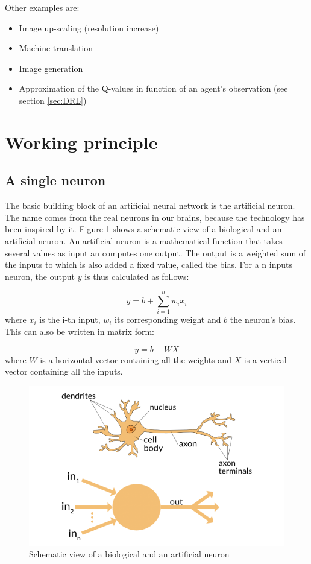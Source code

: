 Other examples are:
\begin{itemize}
    \item Image up-scaling (resolution increase)
    \item Machine translation
    \item Image generation 
    \item Approximation of the Q-values in function of an agent's observation (see section \ref{sec:DRL})
\end{itemize}

\section{Working principle}

\subsection{A single neuron}

The basic building block of an artificial neural network is the artificial neuron. The name comes from the real neurons in our brains, because the technology has been inspired by it. Figure \ref{fig:neuron} shows a schematic view of a biological and an artificial neuron. An artificial neuron is a mathematical function that takes several values as input an computes one output. The output is a weighted sum of the inputs to which is also added a fixed value, called the bias. For a n inputs neuron, the output $y$ is thus calculated as follows:

\begin{equation} 
    y = b + \sum_{i=1}^n w_i x_i
\end{equation}
where $x_i$ is the i-th input, $w_i$ its corresponding weight and $b$ the neuron's bias. This can also be written in matrix form:

\begin{equation}  \label{eq:neuron}
    y = b + WX 
\end{equation}
where $W$ is a horizontal vector containing all the weights and $X$ is a vertical vector containing all the inputs.\\

\begin{figure}[h!]
    \centering
    \includegraphics[width=.6\textwidth]{images/neuron.png}
    \caption{Schematic view of a biological and an artificial neuron \cite{neuron}}
    \label{fig:neuron}
\end{figure}

